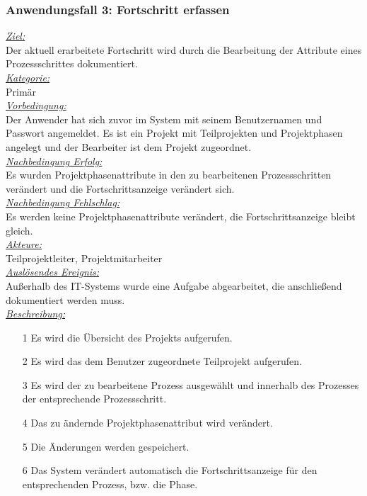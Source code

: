 \subsubsection{Anwendungsfall 3: Fortschritt erfassen}
\underline{\emph{Ziel:}}\\
Der aktuell erarbeitete Fortschritt wird durch die Bearbeitung der Attribute eines Prozessschrittes dokumentiert.\\
\underline{\emph{Kategorie:}} \\
Primär\\
\underline{\emph{Vorbedingung:}} \\
Der Anwender hat sich zuvor im System mit seinem Benutzernamen und Passwort angemeldet. Es ist ein Projekt mit Teilprojekten und Projektphasen angelegt und der Bearbeiter ist dem Projekt zugeordnet.\\
\underline{\emph{Nachbedingung Erfolg:}} \\
Es wurden Projektphasenattribute in den zu bearbeitenen Prozessschritten verändert und die Fortschrittsanzeige verändert sich.\\
\underline{\emph{Nachbedingung Fehlschlag:}} \\
Es werden keine Projektphasenattribute verändert, die Fortschrittsanzeige bleibt gleich.\\
\underline{\emph{Akteure:}} \\
Teilprojektleiter, Projektmitarbeiter\\
\underline{\emph{Auslösendes Ereignis:}} \\
Außerhalb des IT-Systems wurde eine Aufgabe abgearbeitet, die anschließend dokumentiert werden muss.\\
\underline{\emph{Beschreibung:}} 
\begin{itemize}
    \item [1] Es wird die Übersicht des Projekts aufgerufen.
    \item [2] Es wird das dem Benutzer zugeordnete Teilprojekt aufgerufen.
    \item [3] Es wird der zu bearbeitene Prozess ausgewählt und innerhalb des Prozesses der entsprechende Prozessschritt.
    \item [4] Das zu ändernde Projektphasenattribut wird verändert.
    \item [5] Die Änderungen werden gespeichert.
    \item [6] Das System verändert automatisch die Fortschrittsanzeige für den entsprechenden Prozess, bzw. die Phase.
\end{itemize}

